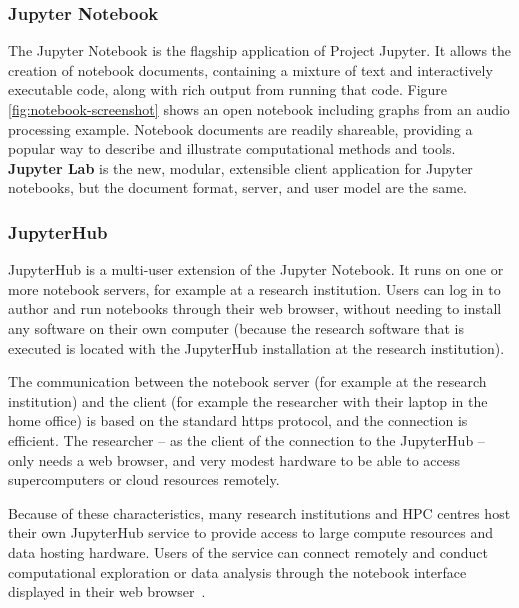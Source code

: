 \subsubsection{Jupyter Notebook}\label{sec:jupyter-notebook} The Jupyter Notebook is
the flagship application of Project Jupyter. 
It allows the creation of notebook documents, containing a mixture of text and
interactively executable code, along with rich output from running that code.
Figure \ref{fig:notebook-screenshot} shows an open notebook including graphs
from an audio processing example. Notebook documents are readily shareable,
providing a popular way to describe and illustrate computational methods and
tools.  \textbf{Jupyter Lab} is the new, modular, extensible
client application for Jupyter notebooks, but the document format, server, and
user model are the same.

\subsubsection{JupyterHub}\label{sec:jupyterhub} JupyterHub is a multi-user extension of the Jupyter Notebook.
It runs on one or more notebook servers, for example at a research institution.
Users can log in to author and run notebooks through their web browser, without
needing to install any software on their own computer (because the research
software that is executed is located with the JupyterHub installation at the
research institution).

The communication between the notebook server (for example at the research
institution) and the client (for example the researcher with their laptop in the
home office) is based on the standard https protocol, and the connection is
efficient. The researcher -- as the client of the connection to the JupyterHub --
only needs a web browser, and very modest hardware to be able to access
supercomputers or cloud resources remotely.


Because of these characteristics, many research institutions and HPC centres host their own
JupyterHub service to provide access to large compute resources and data hosting
hardware. Users of the service can connect remotely and conduct computational
exploration or data analysis through the notebook interface displayed in their
web browser~\cite{Fangohr2020}.
% 


